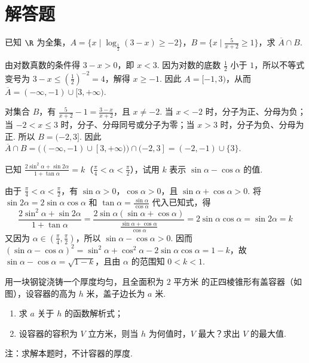 \section{解答题}

\begin{problem}
已知 \(\R\) 为全集，\(A=\{x\mid \log_{\frac{1}{2}}(3-x)\geqslant -2\}\)，\(B=\{x\mid \frac{5}{x+2}\geqslant 1\}\)，求 \(\overline{A}\cap B\).
\end{problem}

\begin{solution}
由对数真数的条件得 \(3-x>0\)，即 \(x<3\). 因为对数的底数 \(\frac{1}{2}\) 小于 \(1\)，所以不等式变号为 \(3-x\leqslant\left(\frac{1}{2}\right)^{-2}=4\)，解得 \(x\geqslant-1\). 因此 \(A=[-1,3)\)，从而 \(\overline{A}=(-\infty,-1)\cup[3,+\infty)\).

对集合 \(B\)，有 \(\frac{5}{x+2}-1=\frac{3-x}{x+2}\)，且 \(x\ne-2\). 当 \(x<-2\) 时，分子为正、分母为负；当 \(-2<x\leqslant3\) 时，分子、分母同号或分子为零；当 \(x>3\) 时，分子为负、分母为正. 所以 \(B=(-2,3]\). 因此 \(\overline{A}\cap B=((-\infty,-1)\cup[3,+\infty))\cap(-2,3]=(-2,-1)\cup\{3\}\).
\end{solution}

\begin{problem}
已知 \(\frac{2\sin^{2}\alpha+\sin 2\alpha}{1+\tan\alpha}=k\)（\(\frac{\pi}{4}<\alpha<\frac{\pi}{2}\)），试用 \(k\) 表示 \(\sin\alpha-\cos\alpha\) 的值.
\end{problem}

\begin{solution}
由于 \(\frac{\pi}{4}<\alpha<\frac{\pi}{2}\)，有 \(\sin\alpha>0\)，\(\cos\alpha>0\)，且 \(\sin\alpha+\cos\alpha>0\). 将 \(\sin2\alpha=2\sin\alpha\cos\alpha\) 和 \(\tan\alpha=\frac{\sin\alpha}{\cos\alpha}\) 代入已知式，得
\[
\frac{2\sin^{2}\alpha+\sin2\alpha}{1+\tan\alpha}=\frac{2\sin\alpha(\sin\alpha+\cos\alpha)}{\frac{\sin\alpha+\cos\alpha}{\cos\alpha}}=2\sin\alpha\cos\alpha=\sin2\alpha=k
\]
又因为 \(\alpha\in\left(\frac{\pi}{4},\frac{\pi}{2}\right)\)，所以 \(\sin\alpha-\cos\alpha>0\). 因而
\(\left(\sin\alpha-\cos\alpha\right)^{2}=\sin^{2}\alpha+\cos^{2}\alpha-2\sin\alpha\cos\alpha=1-k\)，故 \(\sin\alpha-\cos\alpha=\sqrt{1-k}\)，且由 \(\alpha\) 的范围知 \(0<k<1\).
\end{solution}

\begin{problem}
用一块钢锭浇铸一个厚度均匀，且全面积为 \(2\text{ 平方米}\) 的正四棱锥形有盖容器（如图），设容器的高为 \(h\text{ 米}\)，盖子边长为 \(a\text{ 米}\).

\begin{enumerate}
\item 求 \(a\) 关于 \(h\) 的函数解析式；
\item 设容器的容积为 \(V\text{ 立方米}\)，则当 \(h\) 为何值时，\(V\) 最大？求出 \(V\) 的最大值.
\end{enumerate}

注：求解本题时，不计容器的厚度.

\end{problem}

